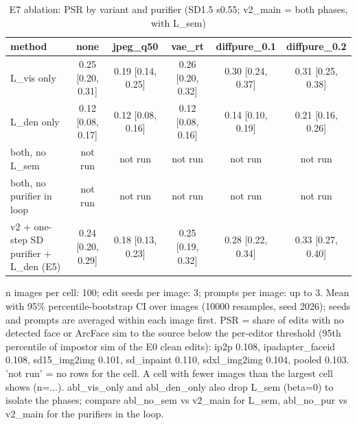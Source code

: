\begin{table}[t]
\centering
\small
\begin{tabular}{lccccc}
\toprule
method & none & jpeg\_q50 & vae\_rt & diffpure\_0.1 & diffpure\_0.2 \\
\midrule
L\_vis only & 0.25 [0.20, 0.31] & 0.19 [0.14, 0.25] & 0.26 [0.20, 0.32] & 0.30 [0.24, 0.37] & 0.31 [0.25, 0.38] \\
L\_den only & 0.12 [0.08, 0.17] & 0.12 [0.08, 0.16] & 0.12 [0.08, 0.16] & 0.14 [0.10, 0.19] & 0.21 [0.16, 0.26] \\
both, no L\_sem & not run & not run & not run & not run & not run \\
both, no purifier in loop & not run & not run & not run & not run & not run \\
v2 + one-step SD purifier + L\_den (E5) & 0.24 [0.20, 0.29] & 0.18 [0.13, 0.23] & 0.25 [0.19, 0.32] & 0.28 [0.22, 0.34] & 0.33 [0.27, 0.40] \\
\bottomrule
\end{tabular}
\caption{E7 ablation: PSR by variant and purifier (SD1.5 s0.55; v2\_main = both phases, with L\_sem)}
\label{tab:e7}
\par\footnotesize n images per cell: 100; edit seeds per image: 3; prompts per image: up to 3. Mean with 95\% percentile-bootstrap CI over images (10000 resamples, seed 2026); seeds and prompts are averaged within each image first. PSR = share of edits with no detected face or ArcFace sim to the source below the per-editor threshold (95th percentile of impostor sim of the E0 clean edits): ip2p 0.108, ipadapter\_faceid 0.108, sd15\_img2img 0.101, sd\_inpaint 0.110, sdxl\_img2img 0.104, pooled 0.103. 'not run' = no rows for the cell. A cell with fewer images than the largest cell shows (n=...). abl\_vis\_only and abl\_den\_only also drop L\_sem (beta=0) to isolate the phases; compare abl\_no\_sem vs v2\_main for L\_sem, abl\_no\_pur vs v2\_main for the purifiers in the loop.
\end{table}
